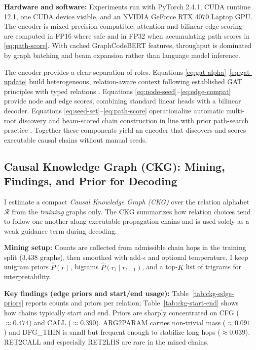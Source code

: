 \documentclass{buthesis}
\begin{document}
\textbf{Hardware and software:} Experiments run with PyTorch 2.4.1, CUDA runtime 12.1, one CUDA device visible, and an NVIDIA GeForce RTX 4070 Laptop GPU. The encoder is mixed-precision compatible; attention and bilinear edge scoring are computed in FP16 where safe and in FP32 when accumulating path scores in \eqref{eq:path-score}. With cached GraphCodeBERT features, throughput is dominated by graph batching and beam expansion rather than language model inference.

The encoder provides a clear separation of roles. Equations \eqref{eq:gat-alpha}–\eqref{eq:gat-update} build heterogeneous, relation-aware context following established GAT principles \cite{velickovic2018gat} with typed relations \cite{schlichtkrull2018rgcn,wang2019han}. Equations \eqref{eq:node-seed}–\eqref{eq:edge-compat} provide node and edge scores, combining standard linear heads with a bilinear decoder. Equations \eqref{eq:seed-set}–\eqref{eq:path-score} operationalize automatic multi-root discovery and beam-scored chain construction in line with prior path-search practice \cite{das2018minerva,xiong2017deeppath}. Together these components yield an encoder that discovers and scores executable causal chains without manual seeds.


\subsection{Causal Knowledge Graph (CKG): Mining, Findings, and Prior for Decoding}
\label{sec:model-arch-ckg}

I estimate a compact \emph{Causal Knowledge Graph (CKG)} over the relation alphabet $\mathcal{R}$ from the \emph{training} graphs only. The CKG summarizes how relation choices tend to follow one another along executable propagation chains and is used solely as a weak guidance term during decoding.

\textbf{Mining setup:}
Counts are collected from admissible chain hops in the training split (3{,}438 graphs), then smoothed with add-$\epsilon$ and optional temperature. I keep unigram priors $\widehat{P}(r)$, bigrams $\widehat{P}(r_t\!\mid r_{t-1})$, and a top-$K$ list of trigrams for interpretability.

\textbf{Key findings (edge priors and start/end usage):}
Table~\ref{tab:ckg-edge-priors} reports counts and priors per relation; Table~\ref{tab:ckg-start-end} shows how chains typically start and end. Priors are sharply concentrated on \textsc{CFG} ($\approx 0.474$) and \textsc{CALL} ($\approx 0.390$). \textsc{ARG2PARAM} carries non-trivial mass ($\approx 0.091$) and \textsc{DFG\_THIN} is small but frequent enough to stabilize long hops ($\approx 0.039$). \textsc{RET2CALL} and especially \textsc{RET2LHS} are rare in the mined chains.
\end{document}
